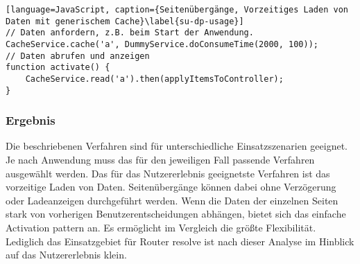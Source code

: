 \begin{lstlisting}[language=JavaScript, caption={Seitenübergänge, Vorzeitiges Laden von Daten mit generischem Cache}\label{su-dp-usage}]
// Daten anfordern, z.B. beim Start der Anwendung.
CacheService.cache('a', DummyService.doConsumeTime(2000, 100));
// Daten abrufen und anzeigen
function activate() {
	CacheService.read('a').then(applyItemsToController);
}
\end{lstlisting}

\subsubsection{Ergebnis}
Die beschriebenen Verfahren sind für unterschiedliche Einsatzszenarien geeignet. Je nach Anwendung muss das für den jeweiligen Fall passende Verfahren ausgewählt werden. Das für das Nutzererlebnis geeignetste Verfahren ist das vorzeitige Laden von Daten. Seitenübergänge können dabei ohne Verzögerung oder Ladeanzeigen durchgeführt werden. Wenn die Daten der einzelnen Seiten stark von vorherigen Benutzerentscheidungen abhängen, bietet sich das einfache Activation pattern an. Es ermöglicht im Vergleich die größte Flexibilität. Lediglich das Einsatzgebiet für Router resolve ist nach dieser Analyse im Hinblick auf das Nutzererlebnis klein.
